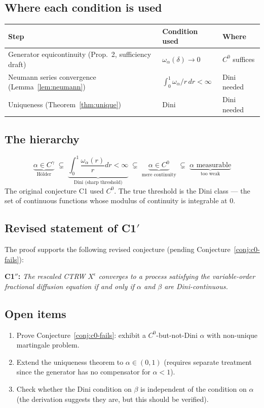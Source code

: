 \documentclass{amsart}
\theoremstyle{definition}
\begin{document}
\subsection{Where each condition is used}

\begin{center}
\renewcommand{\arraystretch}{1.3}
\begin{tabular}{lll}
\hline
Step & Condition used & Where \\
\hline
Generator equicontinuity (Prop.\ 2, sufficiency draft) & $\omega_\alpha(\delta)\to 0$ & $C^0$ suffices \\
Neumann series convergence (Lemma~\ref{lem:neumann}) & $\int_0^1\omega_\alpha/r\,dr<\infty$ & Dini needed \\
Uniqueness (Theorem~\ref{thm:unique}) & Dini & Dini needed \\
\hline
\end{tabular}
\end{center}

\subsection{The hierarchy}
\[
    \underbrace{\alpha\in C^\gamma}_{\text{Hölder}}
    \;\subsetneq\;
    \underbrace{\int_0^1\frac{\omega_\alpha(r)}{r}dr<\infty}_{\text{Dini (sharp threshold)}}
    \;\subsetneq\;
    \underbrace{\alpha\in C^0}_{\text{mere continuity}}
    \;\subsetneq\;
    \underbrace{\alpha\text{ measurable}}_{\text{too weak}}
\]
The original conjecture C1 used $C^0$. The true threshold is the Dini class ---
the set of continuous functions whose modulus of continuity is integrable at 0.

\subsection{Revised statement of C1$'$}

The proof supports the following revised conjecture (pending Conjecture~\ref{conj:c0-fails}):

\medskip
\noindent\textbf{C1$''$:}
\textit{The rescaled CTRW $X^\epsilon$ converges to a process satisfying the variable-order
fractional diffusion equation if and only if $\alpha$ and $\beta$ are Dini-continuous.}

\subsection{Open items}

\begin{enumerate}
    \item Prove Conjecture~\ref{conj:c0-fails}: exhibit a $C^0$-but-not-Dini $\alpha$ with
          non-unique martingale problem.
    \item Extend the uniqueness theorem to $\alpha\in(0,1)$ (requires separate
          treatment since the generator has no compensator for $\alpha<1$).
    \item Check whether the Dini condition on $\beta$ is independent of the condition
          on $\alpha$ (the derivation suggests they are, but this should be verified).
\end{enumerate}
\end{document}
